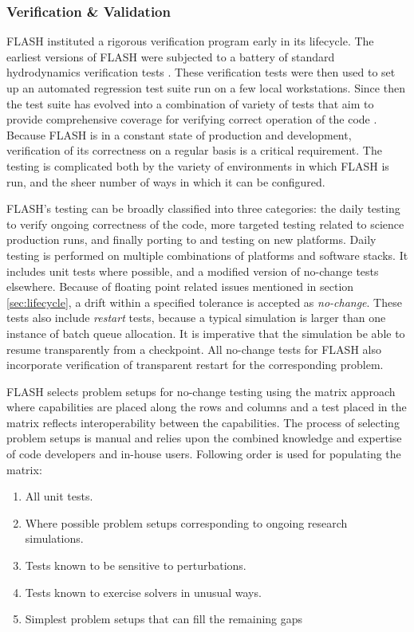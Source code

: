 \subsubsection{Verification \& Validation}
\label{sec:FLASHvandv}

FLASH instituted a rigorous verification program early in its
lifecycle. The earliest versions of FLASH were subjected to
a battery of standard hydrodynamics verification tests
\cite{Fryxell2000}. These verification tests were then used to set up
an automated regression test suite run on a few local
workstations. Since then the test suite has evolved into a
combination of variety of tests that aim to provide comprehensive
coverage for verifying correct operation of the code
\cite{Dubey2013,Calder2005}. Because FLASH is in a constant state of
production and development, verification of its correctness on a
regular basis is a critical requirement.  The testing is complicated
both by the variety of environments in which FLASH is run, and the
sheer number of ways in which it can be configured. 

FLASH's testing can be broadly classified into
three categories: the daily testing to verify ongoing correctness of
the code, more targeted testing  related to science production runs,
and finally porting to and testing on new platforms. Daily testing is
performed on multiple combinations of platforms and software
stacks. It includes unit tests where possible, and a modified version
of no-change tests elsewhere. Because of floating point related issues
mentioned in section \ref{sec:lifecycle}, a drift within a specified
tolerance is accepted as {\em no-change}. These tests also include
{\em restart} tests, because a typical simulation is larger than one
instance of batch queue allocation. It is imperative that the
simulation be able to resume transparently from a checkpoint. All
no-change tests for FLASH also incorporate verification of transparent
restart for the corresponding problem. 

FLASH selects problem setups for no-change testing using the matrix
approach where capabilities are placed along the rows and columns and
a test placed in the matrix reflects interoperability between the
capabilities. The process of selecting problem setups is manual and
relies upon the combined knowledge and expertise of code developers
and in-house users.  Following order is used for populating the matrix:
\begin {enumerate}
\item All unit tests.
\item Where possible problem setups corresponding to ongoing research
  simulations.
\item Tests known to be sensitive to perturbations.
\item Tests known to exercise solvers in unusual ways.
\item Simplest problem setups that can fill the remaining gaps
\end {enumerate}


